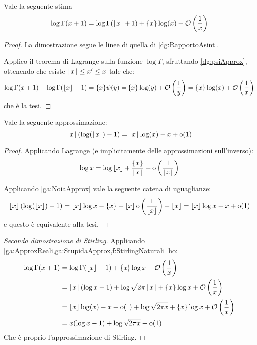 \begin{lemma}\label{ga:ApproxReali}
	Vale la seguente stima
	\begin{equation*}
		\log{\Gamma(x+1)}=\log{\Gamma(\ensuremath{\left\lfloor x \right\rfloor} +1)}+\{x\}\log(x)+\mathcal{O}\left(\frac 1x\right)
	\end{equation*}
\end{lemma}
\begin{proof}
	La dimostrazione segue le linee di quella di \cref{dg:RapportoAsint}.
	
	Applico il teorema di Lagrange sulla funzione $\log\Gamma$, sfruttando \cref{dg:psiApprox}, ottenendo che esiste
	$\left\lfloor x \right\rfloor\le x'\le x$ tale che:
	\begin{equation}
		\log{\Gamma(x+1)}-\log{\Gamma(\ensuremath{\left\lfloor x \right\rfloor} +1)}=\{x\}\psi(y)=\{x\}\log(y)+\mathcal{O}\left(\frac 1y\right)=
		\{x\}\log(x)+\mathcal{O}\left(\frac 1x\right)
	\end{equation}
	che è la tesi.
\end{proof}

\begin{lemma}\label{ga:StupidaApprox}
	Vale la seguente approssimazione:
	\begin{equation*}
		\left\lfloor x \right\rfloor(\log(\left\lfloor x \right\rfloor)-1)=\left\lfloor x \right\rfloor \log(x)-x+\mathrm{o}(1)
	\end{equation*}
\end{lemma}
\begin{proof}
	Applicando Lagrange (e implicitamente delle approssimazioni sull'inverso):
	\begin{equation}\label{ga:NoiaApprox}
		\log{x}=\log{\ensuremath{\left\lfloor x \right\rfloor}} + \frac{\{x\}}{\left\lfloor x \right\rfloor} +\mathrm{o}\left(\frac 1{\left\lfloor x \right\rfloor}\right)
	\end{equation}
	
	Applicando \cref{ga:NoiaApprox} vale la seguente catena di uguaglianze:
	\begin{equation*}
		\left\lfloor x \right\rfloor(\log(\left\lfloor x \right\rfloor)-1)=\left\lfloor x \right\rfloor\log{x}-\{x\}+
		\left\lfloor x \right\rfloor\mathrm{o}\left(\frac 1{\left\lfloor x \right\rfloor}\right)-\left\lfloor x \right\rfloor=
		\left\lfloor x \right\rfloor\log{x}-x+\mathrm{o}(1)
	\end{equation*}
	e questo è equivalente alla tesi.
\end{proof}



\begin{proof}[Seconda dimostrazione di Stirling]
	Applicando \cref{ga:ApproxReali,ga:StupidaApprox,f:StirlingNaturali} ho:
	\begin{equation*}\begin{split}
		\log{\Gamma(x+1)}&=\log\Gamma(\left\lfloor x \right\rfloor+1)+\{x\}\log{x}+\mathcal{O}\left(\frac 1x\right)\\
		&=\left\lfloor x \right\rfloor\left(\log{x}-1\right)+\log{\sqrt{2\pi\ensuremath{\left\lfloor x \right\rfloor}}}+\{x\}\log{x}+\mathcal{O}\left(\frac 1x\right)\\
		&=\left\lfloor x \right\rfloor \log(x)-x+\mathrm{o}(1)+\log{\sqrt{2\pi x}}+\{x\}\log{x}+\mathcal{O}\left(\frac 1x\right)\\
		&=x(\log{x}-1)+\log{\sqrt{2\pi x}}+\mathrm{o}(1)
	\end{split}\end{equation*}
	Che è proprio l'approssimazione di Stirling.
\end{proof}






